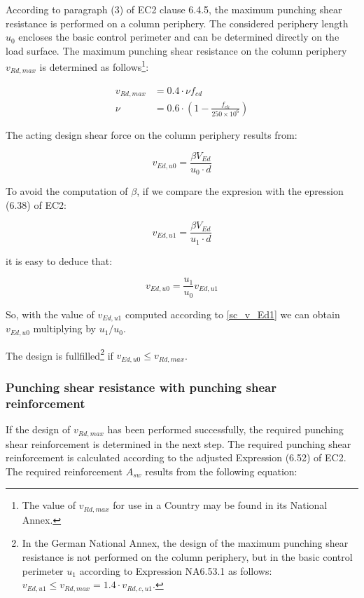 According to paragraph (3) of EC2 clause 6.4.5, the maximum punching shear resistance is performed on a column periphery. The considered periphery length $u_0$ encloses the basic control perimeter and can be determined directly on the load surface. The maximum punching shear resistance on the column periphery $v_{Rd, max}$ is determined as follows\footnote{The value of $v_{Rd, max}$ for use in a Country may be found in its National Annex.}:

\begin{align}
  v_{Rd, max}&= 0.4 \cdot \nu f_{cd}\\
  \nu &= 0.6 \cdot (1 - \frac{f_{ck}}{250 \times 10^6})
\end{align}

The acting design shear force on the column periphery results from:

\begin{equation}\label{eq_v_Ed0}
  v_{Ed,u0}= \frac{\beta V_{Ed}}{u_0 \cdot d}
\end{equation}
 
To avoid the computation of $\beta$, if we compare the expresion \label{eq_v_Ed0} with the epression (6.38) of EC2:

\begin{equation}\label{eq_v_Ed0}
  v_{Ed,u1}= \frac{\beta V_{Ed}}{u_1 \cdot d}
\end{equation}

\noindent it is easy to deduce that:

\begin{equation}\label{eq_v_Ed1}
  v_{Ed,u0}= \frac{u_1}{u_0} v_{Ed,u1}
\end{equation}

So, with the value of $v_{Ed,u1}$ computed according to \ref{sc_v_Ed1} we can obtain $v_{Ed,u0}$ multiplying by $u_1/u_0$.

The design is fullfilled\footnote{In the German National Annex, the design of the maximum punching shear resistance is not performed on the column periphery, but in the basic control perimeter $u_1$ according to Expression NA6.53.1 as follows: $v_{Ed,u1} \leq v_{Rd, max} = 1.4 \cdot v_{Rd,c,u1}$.} if $v_{Ed,u0} \leq  v_{Rd, max}$.

\subsubsection{Punching shear resistance with punching shear reinforcement}
If the design of $v_{Rd, max}$ has been performed successfully, the required punching shear reinforcement is determined in the next step. The required punching shear reinforcement is calculated according to the adjusted Expression (6.52) of EC2. The required reinforcement $A_{sw}$ results from the following equation:

